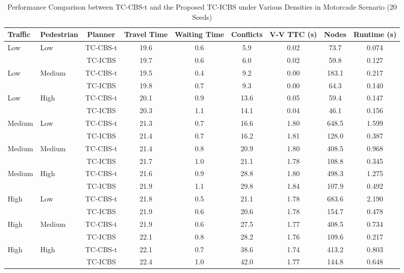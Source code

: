 \begin{table}[t]
\centering
\caption{Performance Comparison between TC-CBS-t and the Proposed TC-ICBS under Various Densities in Motorcade Scenario (20 Seeds)}
\begin{tabular}{llccccccc}
\hline
Traffic & Pedestrian & Planner & Travel Time & Waiting Time & Conflicts & V-V TTC (s) & Nodes & Runtime (s) \\
\hline
Low & Low & TC-CBS-t & 19.6 & 0.6 & 5.9 & 0.02 & 73.7 & 0.074 \\
 & & TC-ICBS & 19.7 & 0.6 & 6.0 & 0.02 & 59.8 & 0.127 \\
\hline
Low & Medium & TC-CBS-t & 19.5 & 0.4 & 9.2 & 0.00 & 183.1 & 0.217 \\
 & & TC-ICBS & 19.8 & 0.7 & 9.3 & 0.00 & 64.3 & 0.140 \\
\hline
Low & High & TC-CBS-t & 20.1 & 0.9 & 13.6 & 0.05 & 59.4 & 0.147 \\
 & & TC-ICBS & 20.3 & 1.1 & 14.1 & 0.04 & 46.1 & 0.156 \\
\hline
Medium & Low & TC-CBS-t & 21.3 & 0.7 & 16.6 & 1.80 & 648.5 & 1.599 \\
 & & TC-ICBS & 21.4 & 0.7 & 16.2 & 1.81 & 128.0 & 0.387 \\
\hline
Medium & Medium & TC-CBS-t & 21.4 & 0.8 & 20.9 & 1.80 & 408.5 & 0.968 \\
 & & TC-ICBS & 21.7 & 1.0 & 21.1 & 1.78 & 108.8 & 0.345 \\
\hline
Medium & High & TC-CBS-t & 21.6 & 0.9 & 28.8 & 1.80 & 498.3 & 1.275 \\
 & & TC-ICBS & 21.9 & 1.1 & 29.8 & 1.84 & 107.9 & 0.492 \\
\hline
High & Low & TC-CBS-t & 21.8 & 0.5 & 21.1 & 1.78 & 683.6 & 2.190 \\
 & & TC-ICBS & 21.9 & 0.6 & 20.6 & 1.78 & 154.7 & 0.478 \\
\hline
High & Medium & TC-CBS-t & 21.9 & 0.6 & 27.5 & 1.77 & 408.5 & 0.734 \\
 & & TC-ICBS & 22.1 & 0.8 & 28.2 & 1.76 & 109.6 & 0.217 \\
\hline
High & High & TC-CBS-t & 22.1 & 0.7 & 38.6 & 1.74 & 413.2 & 0.803 \\
 & & TC-ICBS & 22.4 & 1.0 & 42.0 & 1.77 & 144.8 & 0.648 \\
\hline
\end{tabular}
\label{tab:motorcade}
\end{table}